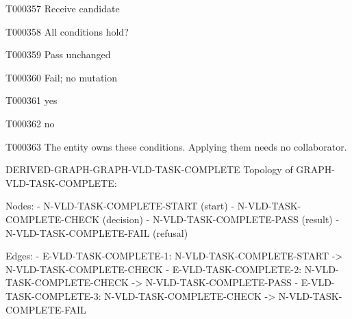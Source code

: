 \documentclass[11pt,a4paper]{article}
\begin{document}
\begin{atlastext}{T000357}
Receive candidate
\end{atlastext}
\begin{atlastext}{T000358}
All conditions hold?
\end{atlastext}
\begin{atlastext}{T000359}
Pass unchanged
\end{atlastext}
\begin{atlastext}{T000360}
Fail; no mutation
\end{atlastext}
\begin{atlastext}{T000361}
yes
\end{atlastext}
\begin{atlastext}{T000362}
no
\end{atlastext}
\begin{atlasparagraph}{T000363}
The entity owns these conditions. Applying them needs no collaborator.
\end{atlasparagraph}
\par\noindent\begin{minipage}{\linewidth}
\begin{atlasderived}{DERIVED-GRAPH-GRAPH-VLD-TASK-COMPLETE}
Topology of GRAPH-VLD-TASK-COMPLETE:

Nodes:
- N-VLD-TASK-COMPLETE-START (start)
- N-VLD-TASK-COMPLETE-CHECK (decision)
- N-VLD-TASK-COMPLETE-PASS (result)
- N-VLD-TASK-COMPLETE-FAIL (refusal)

Edges:
- E-VLD-TASK-COMPLETE-1: N-VLD-TASK-COMPLETE-START -> N-VLD-TASK-COMPLETE-CHECK
- E-VLD-TASK-COMPLETE-2: N-VLD-TASK-COMPLETE-CHECK -> N-VLD-TASK-COMPLETE-PASS
- E-VLD-TASK-COMPLETE-3: N-VLD-TASK-COMPLETE-CHECK -> N-VLD-TASK-COMPLETE-FAIL
\end{atlasderived}
\end{minipage}\par
\end{document}
